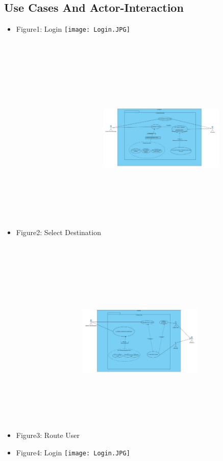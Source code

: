 \documentclass[12pt, a4paper]{article}
\begin{document}
		\subsection{Use Cases And Actor-Interaction}
			\begin{itemize}
				\item Figure1: Login
					\texttt{[image: Login.JPG]}
				\item Figure2: Select Destination
					\includegraphics[width = 6cm, height = 10cm]{Select_Destination.JPG}
				\item Figure3: Route User
					\includegraphics[width = 6cm, height = 10cm]{Route_User.JPG}
				\item Figure4: Login
					\texttt{[image: Login.JPG]}

\end{itemize}
\end{document}
